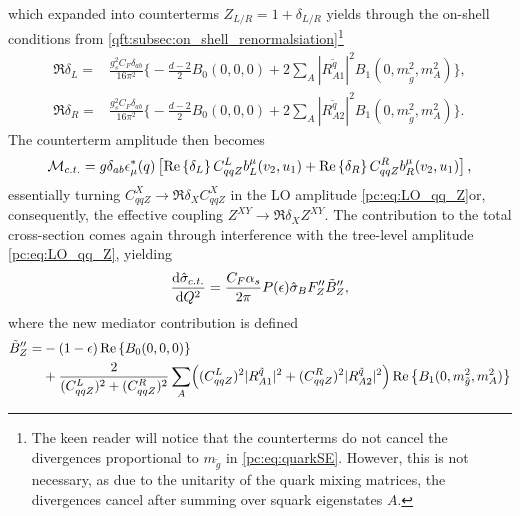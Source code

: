 \documentclass[../main.tex]{subfiles}
\begin{document}
which expanded into counterterms \(Z_{L/R} = 1 + \delta_{L/R}\) yields through the on-shell conditions from \cref{qft:subsec:on_shell_renormalsiation}\footnote{The keen reader will notice that the counterterms do not cancel the divergences proportional to \(m_{\tilde{g}}\) in \cref{pc:eq:quarkSE}. However, this is not necessary, as due to the unitarity of the quark mixing matrices, the divergences cancel after summing over squark eigenstates \(A\).}
\begin{subequations}
  \begin{align}
    \Re{\delta_L} = & \frac{g_s^2 C_F \delta_{ab}}{16\pi^2} \biggl\{
    -\frac{d-2}{2} B_0(0,0,0) + 2\sum_A|R^{\tilde{q}}_{A1}|^2B_1(0,m_{\tilde{g}}^2,m_A^2)
    \biggr\} ,                                                       \\
    \Re{\delta_R} = & \frac{g_s^2 C_F \delta_{ab}}{16\pi^2} \biggl\{
    -\frac{d-2}{2} B_0(0,0,0) + 2\sum_A|R^{\tilde{q}}_{A2}|^2B_1(0,m_{\tilde{g}}^2,m_A^2)
    \biggr\}.
  \end{align}
\end{subequations}
The counterterm amplitude then becomes
\begin{equation}
  \M_{c.t.} = g \delta_{ab} \epsilon_\mu^\ast(q) \bclosed{\Re{\delta_L} C_{qqZ}^L b_L^\mu(v_2,u_1) + \Re{\delta_R} C_{qqZ}^R b_R^\mu(v_2,u_1)},
\end{equation}
essentially turning \(C_{qqZ}^X \to \Re{\delta_X} C_{qqZ}^X\) in the LO amplitude \cref{pc:eq:LO_qq_Z}or, consequently, the effective coupling \(Z^{XY} \to \Re{\delta_X} Z^{XY}\).
The contribution to the total cross-section comes again through interference with the tree-level amplitude \cref{pc:eq:LO_qq_Z}, yielding
\begin{equation}
  \d[Q^2]{\hat\sigma_{c.t.}} = \frac{C_F \alpha_s}{2\pi} P(\epsilon) \hat\sigma_B F_{Z}^{\prime\prime} \tilde{B}^{\prime\prime}_Z,
\end{equation}
where the new mediator contribution is defined
\begin{align}
  \nonumber
  \tilde{B}^{\prime\prime}_Z = & -(1-\epsilon) \Re{B_0(0,0,0)}                                                                                                                                                  \\
                               & + \frac{2}{(C_{qqZ}^L)^2 + (C_{qqZ}^R)^2} \sum_A \Bigl( (C_{qqZ}^L)^2 |R_{A1}^{\tilde{q}}|^2 + (C_{qqZ}^R)^2 |R_{A2}^{\tilde{q}}|^2 \Bigr) \Re{B_1(0, m_{\tilde{g}}^2, m_A^2)}
\end{align}
\end{document}
